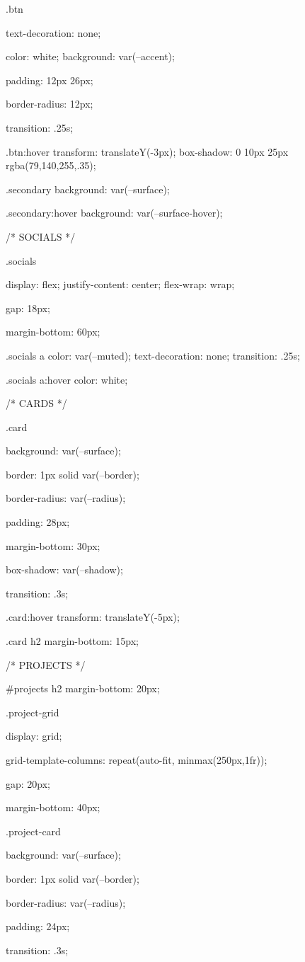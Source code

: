 .btn {
    text-decoration: none;

    color: white;
    background: var(--accent);

    padding: 12px 26px;

    border-radius: 12px;

    transition: .25s;
}

.btn:hover {
    transform: translateY(-3px);
    box-shadow: 0 10px 25px rgba(79,140,255,.35);
}

.secondary {
    background: var(--surface);
}

.secondary:hover {
    background: var(--surface-hover);
}

/* SOCIALS */

.socials {
    display: flex;
    justify-content: center;
    flex-wrap: wrap;

    gap: 18px;

    margin-bottom: 60px;
}

.socials a {
    color: var(--muted);
    text-decoration: none;
    transition: .25s;
}

.socials a:hover {
    color: white;
}

/* CARDS */

.card {
    background: var(--surface);

    border: 1px solid var(--border);

    border-radius: var(--radius);

    padding: 28px;

    margin-bottom: 30px;

    box-shadow: var(--shadow);

    transition: .3s;
}

.card:hover {
    transform: translateY(-5px);
}

.card h2 {
    margin-bottom: 15px;
}

/* PROJECTS */

#projects h2 {
    margin-bottom: 20px;
}

.project-grid {
    display: grid;

    grid-template-columns: repeat(auto-fit, minmax(250px,1fr));

    gap: 20px;

    margin-bottom: 40px;
}

.project-card {
    background: var(--surface);

    border: 1px solid var(--border);

    border-radius: var(--radius);

    padding: 24px;

    transition: .3s;
}

